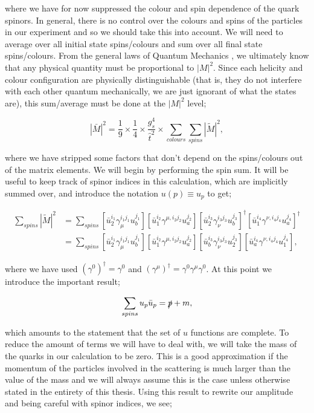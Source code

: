 where we have for now suppressed the colour and spin dependence of the quark spinors. In general, there is no control over the colours and spins of the particles in our experiment and so we should take this into account. We will need to average over all initial state spins/colours and sum over all final state spins/colours. From the general laws of Quantum Mechanics \cite{Dirac}, we ultimately know that any physical quantity must be proportional to $|M|^2$. Since each helicity and colour configuration are physically distinguishable (that is, they do not interfere with each other quantum mechanically, we are just ignorant of what the states are), this sum/average must be done at the $|M|^2$ level;

\begin{equation}
|\bar{M}|^2 = \frac{1}{9} \times \frac{1}{4} \times \frac{g_s^4}{\hat{t}^2} \times \sum_{colours}  \sum_{spins} |\tilde{M}|^2,
\end{equation}

where we have stripped some factors that don't depend on the spins/colours out of the matrix elements. We will begin by performing the spin sum. It will be useful to keep track of spinor indices in this calculation, which are implicitly summed over, and introduce the notation $u(p) \equiv u_p$ to get;

\begin{equation}
\begin{split}
\sum_{spins}|\tilde{M}|^2 &= \sum_{spins}  [\bar{u}_2^{i_1} \gamma_\mu^{i_1 j_1} u_b^{j_1}][\bar{u}_1^{i_2}\gamma^{\mu, i_2 j_2} u_a^{j_2}] [\bar{u}_2^{i_3}\gamma_\nu^{i_3 j_3} u_b^{j_3}]^\dagger [\bar{u}_1^{i_4}\gamma^{\nu, i_4 j_4} u_a^{j_4}]^\dagger \\
&= \sum_{spins}  [\bar{u}_2^{i_1} \gamma_\mu^{i_1 j_1} u_b^{j_1}][\bar{u}_1^{i_2}\gamma^{\mu, i_2 j_2} u_a^{j_2}] [\bar{u}_b^{i_3} \gamma_\nu^{i_3 j_3}  u_2^{j_3}][\bar{u}_a^{i_4}  \gamma^{\nu, i_4 j_4} u_1^{j_4}],
\end{split}
\end{equation}

where we have used $(\gamma^0)^\dagger = \gamma^0$ and $(\gamma^\mu)^\dagger = \gamma^0 \gamma^\mu \gamma^0$. At this point we introduce the important result;

\begin{equation}
\sum_{spins} u_p \bar{u}_p = \slashed{p} + m, 
\end{equation}

which amounts to the statement that the set of $u$ functions are complete. To reduce the amount of terms we will have to deal with, we will take the mass of the quarks in our calculation to be zero. This is a good approximation if the momentum of the particles involved in the scattering is much larger than the value of the mass and we will always assume this is the case unless otherwise stated in the entirety of this thesis. Using this result to rewrite our amplitude and being careful with spinor indices, we see;

